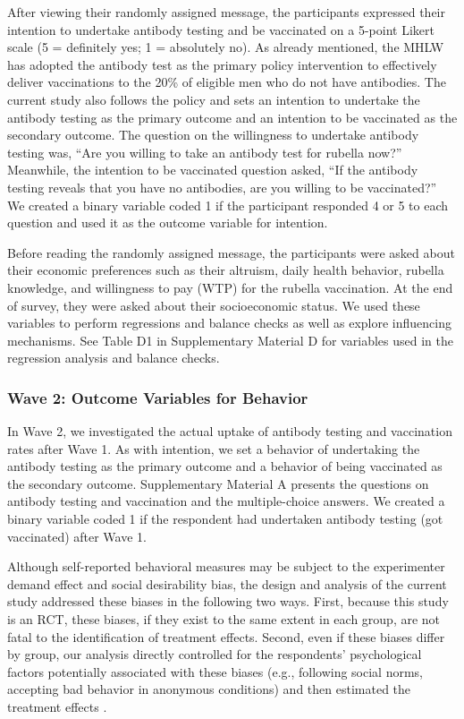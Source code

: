 \documentclass[
  11pt,
  a4paper
]{article}
\begin{document}
After viewing their randomly assigned message, the participants expressed their intention to undertake antibody testing and be vaccinated on a 5-point Likert scale (5 = definitely yes; 1 = absolutely no). As already mentioned, the MHLW has adopted the antibody test as the primary policy intervention to effectively deliver vaccinations to the 20\% of eligible men who do not have antibodies. The current study also follows the policy and sets an intention to undertake the antibody testing as the primary outcome and an intention to be vaccinated as the secondary outcome. The question on the willingness to undertake antibody testing was, ``Are you willing to take an antibody test for rubella now?'' Meanwhile, the intention to be vaccinated question asked, ``If the antibody testing reveals that you have no antibodies, are you willing to be vaccinated?'' We created a binary variable coded 1 if the participant responded 4 or 5 to each question and used it as the outcome variable for intention.

Before reading the randomly assigned message, the participants were asked about their economic preferences such as their altruism, daily health behavior, rubella knowledge, and willingness to pay (WTP) for the rubella vaccination. At the end of survey, they were asked about their socioeconomic status. We used these variables to perform regressions and balance checks as well as explore influencing mechanisms. See Table D1 in Supplementary Material D for variables used in the regression analysis and balance checks.

\hypertarget{wave2}{%
\subsubsection{Wave 2: Outcome Variables for Behavior}\label{wave2}}

In Wave 2, we investigated the actual uptake of antibody testing and vaccination rates after Wave 1. As with intention, we set a behavior of undertaking the antibody testing as the primary outcome and a behavior of being vaccinated as the secondary outcome. Supplementary Material A presents the questions on antibody testing and vaccination and the multiple-choice answers. We created a binary variable coded 1 if the respondent had undertaken antibody testing (got vaccinated) after Wave 1.

Although self-reported behavioral measures may be subject to the experimenter demand effect and social desirability bias, the design and analysis of the current study addressed these biases in the following two ways. First, because this study is an RCT, these biases, if they exist to the same extent in each group, are not fatal to the identification of treatment effects. Second, even if these biases differ by group, our analysis directly controlled for the respondents' psychological factors potentially associated with these biases (e.g., following social norms, accepting bad behavior in anonymous conditions) and then estimated the treatment effects .
\end{document}
